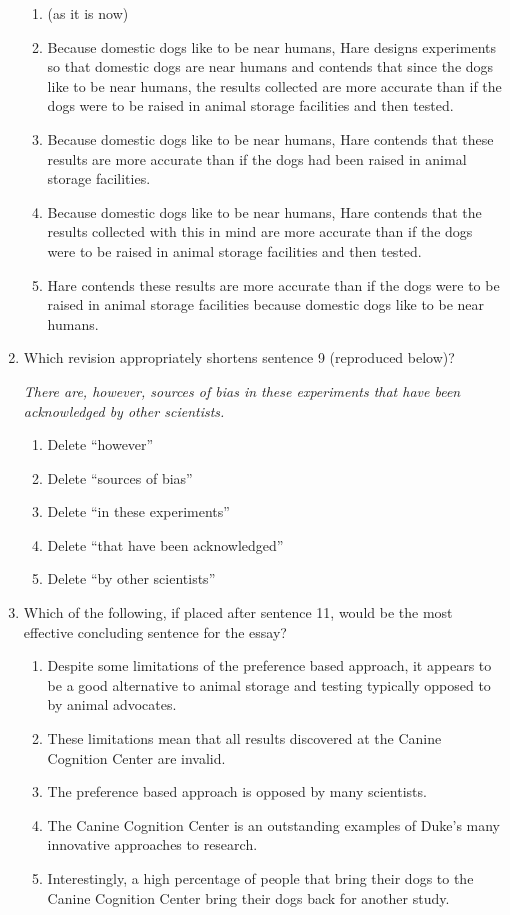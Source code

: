 \begin{enumerate}
\begin{enumerate}[label=(\Alph*)]
\item (as it is now)
\item Because domestic dogs like to be near humans, Hare designs experiments so that domestic dogs are near humans and contends that since the dogs like to be near humans, the results collected are more accurate than if the dogs were to be raised in animal storage facilities and then tested.
\item  Because domestic dogs like to be near humans, Hare contends that these results are more accurate than if the dogs had been raised in animal storage facilities. 
\item Because domestic dogs like to be near humans, Hare contends that the results collected with this in mind are more accurate than if the dogs were to be raised in animal storage facilities and then tested.
\item Hare contends these results are more accurate than if the dogs were to be raised in animal storage facilities because domestic dogs like to be near humans.
\end{enumerate}

\item Which revision appropriately shortens sentence 9 (reproduced below)?

\textit{There are, however, sources of bias in these experiments that have been acknowledged by other scientists.}

\begin{enumerate}[label=(\Alph*)]
\item Delete ``however''
\item Delete ``sources of bias''
\item Delete ``in these experiments''
\item Delete  ``that have been acknowledged''
\item Delete ``by other scientists''
\end{enumerate}

\item Which of the following, if placed after sentence 11, would be the most effective concluding sentence for the essay?

\begin{enumerate}[label=(\Alph*)]
\item  Despite some limitations of the preference based approach, it appears to be a good alternative to animal storage and testing typically opposed to by animal advocates. 
\item These limitations mean that all results discovered at the Canine Cognition Center are invalid. 
\item The preference based approach is opposed by many scientists.
\item The Canine Cognition Center is an outstanding examples of Duke's many innovative approaches to research. 
\item Interestingly, a high percentage of people that bring their dogs to the Canine Cognition Center bring their dogs back for another study. 
\end{enumerate}

\end{enumerate} 

